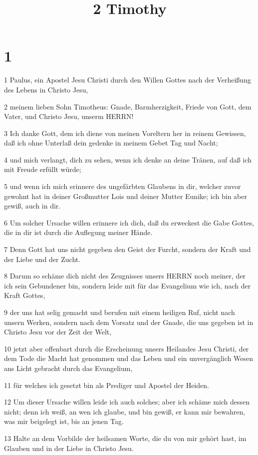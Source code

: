 

\title{2 Timothy}


\chapter{1}

\par 1 Paulus, ein Apostel Jesu Christi durch den Willen Gottes nach der Verheißung des Lebens in Christo Jesu,
\par 2 meinem lieben Sohn Timotheus: Gnade, Barmherzigkeit, Friede von Gott, dem Vater, und Christo Jesu, unserm HERRN!
\par 3 Ich danke Gott, dem ich diene von meinen Voreltern her in reinem Gewissen, daß ich ohne Unterlaß dein gedenke in meinem Gebet Tag und Nacht;
\par 4 und mich verlangt, dich zu sehen, wenn ich denke an deine Tränen, auf daß ich mit Freude erfüllt würde;
\par 5 und wenn ich mich erinnere des ungefärbten Glaubens in dir, welcher zuvor gewohnt hat in deiner Großmutter Lois und deiner Mutter Eunike; ich bin aber gewiß, auch in dir.
\par 6 Um solcher Ursache willen erinnere ich dich, daß du erweckest die Gabe Gottes, die in dir ist durch die Auflegung meiner Hände.
\par 7 Denn Gott hat uns nicht gegeben den Geist der Furcht, sondern der Kraft und der Liebe und der Zucht.
\par 8 Darum so schäme dich nicht des Zeugnisses unsers HERRN noch meiner, der ich sein Gebundener bin, sondern leide mit für das Evangelium wie ich, nach der Kraft Gottes,
\par 9 der uns hat selig gemacht und berufen mit einem heiligen Ruf, nicht nach unsern Werken, sondern nach dem Vorsatz und der Gnade, die uns gegeben ist in Christo Jesu vor der Zeit der Welt,
\par 10 jetzt aber offenbart durch die Erscheinung unsers Heilandes Jesu Christi, der dem Tode die Macht hat genommen und das Leben und ein unvergänglich Wesen ans Licht gebracht durch das Evangelium,
\par 11 für welches ich gesetzt bin als Prediger und Apostel der Heiden.
\par 12 Um dieser Ursache willen leide ich auch solches; aber ich schäme mich dessen nicht; denn ich weiß, an wen ich glaube, und bin gewiß, er kann mir bewahren, was mir beigelegt ist, bis an jenen Tag.
\par 13 Halte an dem Vorbilde der heilsamen Worte, die du von mir gehört hast, im Glauben und in der Liebe in Christo Jesu.

